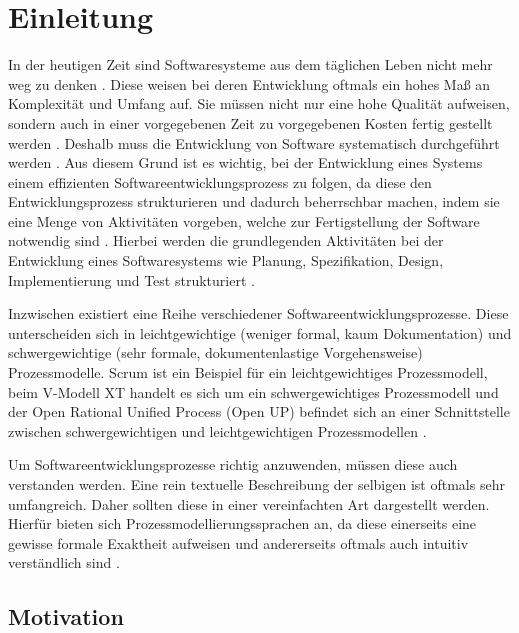 \chapter{Einleitung}\label{sec:chapter1}

In der heutigen Zeit sind Softwaresysteme aus dem täglichen Leben nicht mehr weg zu denken \cite{Puntambekar2007}. Diese weisen bei deren Entwicklung oftmals ein hohes Maß an Komplexität und Umfang auf. Sie müssen nicht nur eine hohe Qualität aufweisen, sondern auch in einer vorgegebenen Zeit zu vorgegebenen Kosten fertig gestellt werden \cite{Grechenig2010}. Deshalb muss die Entwicklung von Software systematisch durchgeführt werden \cite{gumm2012einfuhrung}. Aus diesem Grund ist es wichtig, bei der Entwicklung eines Systems einem effizienten Softwareentwicklungsprozess zu folgen, da diese den Entwicklungsprozess strukturieren und dadurch beherrschbar machen, indem sie eine Menge von Aktivitäten vorgeben, welche zur Fertigstellung der Software notwendig sind \cite{richling2011autonomie}. Hierbei werden die grundlegenden Aktivitäten bei der Entwicklung eines Softwaresystems wie Planung, Spezifikation, Design, Implementierung und Test strukturiert \cite{gumm2012einfuhrung, Hanser2010}. \newline

Inzwischen existiert eine Reihe verschiedener Softwareentwicklungsprozesse. Diese unterscheiden sich in leichtgewichtige (weniger formal, kaum Dokumentation) und schwergewichtige (sehr formale, dokumentenlastige Vorgehensweise) Prozessmodelle. Scrum ist ein Beispiel für ein leichtgewichtiges Prozessmodell, beim V-Modell XT handelt es sich um ein schwergewichtiges Prozessmodell und der Open Rational Unified Process (Open UP) befindet sich an einer Schnittstelle zwischen schwergewichtigen und leichtgewichtigen Prozessmodellen \cite{Hanser2010}.\newline

Um Softwareentwicklungsprozesse richtig anzuwenden, müssen diese auch verstanden werden. Eine rein textuelle Beschreibung der selbigen ist oftmals sehr umfangreich. Daher sollten diese in einer vereinfachten Art dargestellt werden. Hierfür bieten sich Prozessmodellierungssprachen an, da diese einerseits eine gewisse formale Exaktheit aufweisen und andererseits oftmals auch intuitiv verständlich sind \cite{thomas2009,kircher2006}. \newline

\section{Motivation}



